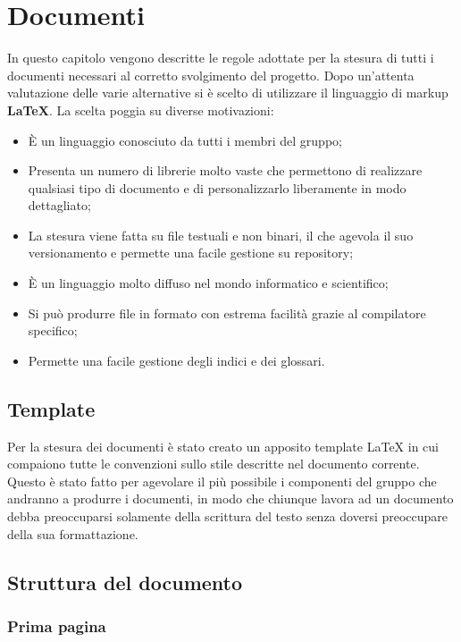 \section{Documenti}

In questo capitolo vengono descritte le regole adottate per la stesura di tutti i documenti necessari al corretto svolgimento del progetto. Dopo un'attenta valutazione delle varie alternative si è scelto di utilizzare il linguaggio di markup \textbf{\LaTeX{}}. La scelta poggia su diverse motivazioni:

\begin{itemize}

	\item È un linguaggio conosciuto da tutti i membri del gruppo;
	\item Presenta un numero di librerie molto vaste che permettono di realizzare qualsiasi tipo di documento e di personalizzarlo liberamente in modo dettagliato;
	\item La stesura viene fatta su file testuali e non binari, il che agevola il suo versionamento e permette una facile gestione su repository;
	\item È un linguaggio molto diffuso nel mondo informatico e scientifico;
	\item Si può produrre file in formato  con estrema facilità grazie al compilatore specifico;
	\item Permette una facile gestione degli indici e dei glossari.

\end{itemize}

\subsection{Template}

Per la stesura dei documenti è stato creato un apposito template \LaTeX{} in cui compaiono tutte le convenzioni sullo stile descritte nel documento corrente. Questo è stato fatto per agevolare il più possibile i componenti del gruppo che andranno a produrre i documenti, in modo che chiunque lavora ad un documento debba preoccuparsi solamente della scrittura del testo senza doversi preoccupare della sua formattazione. 

\subsection{Struttura del documento}

	\subsubsection{Prima pagina}
	

